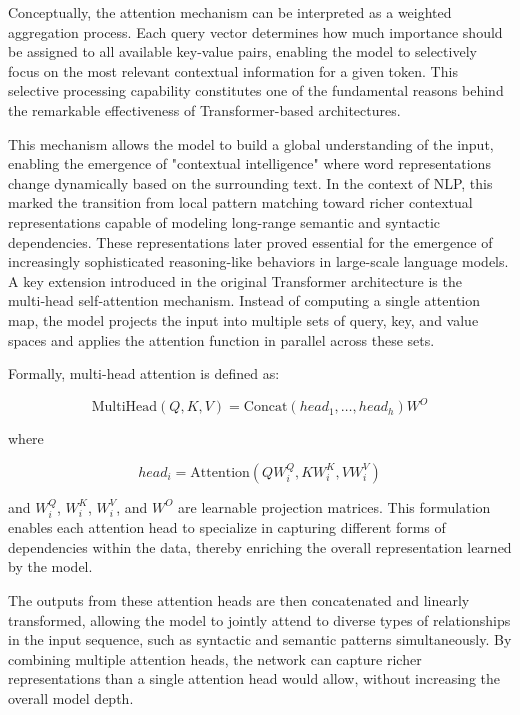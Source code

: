 Conceptually, the attention mechanism can be interpreted as a weighted aggregation process. Each query vector determines how much importance should be assigned to all available key-value pairs, enabling the model to selectively focus on the most relevant contextual information for a given token. This selective processing capability constitutes one of the fundamental reasons behind the remarkable effectiveness of Transformer-based architectures.

This mechanism allows the model to build a global understanding of the input, enabling the emergence of "contextual intelligence" where word representations change dynamically based on the surrounding text. In the context of NLP, this marked the transition from local pattern matching toward richer contextual representations capable of modeling long-range semantic and syntactic dependencies. These representations later proved essential for the emergence of increasingly sophisticated reasoning-like behaviors in large-scale language models.
A key extension introduced in the original Transformer architecture is the multi‑head self‑attention mechanism. Instead of computing a single attention map, the model projects the input into multiple sets of query, key, and value spaces and applies the attention function in parallel across these sets. 


Formally, multi-head attention is defined as:

\begin{equation}
    \text{MultiHead}(Q,K,V)=\text{Concat}(head_1,\dots,head_h)W^O
\end{equation}

where

\begin{equation}
    head_i=\text{Attention}(QW_i^Q,KW_i^K,VW_i^V)
\end{equation}

and $W_i^Q$, $W_i^K$, $W_i^V$, and $W^O$ are learnable projection matrices. This formulation enables each attention head to specialize in capturing different forms of dependencies within the data, thereby enriching the overall representation learned by the model.


The outputs from these attention heads are then concatenated and linearly transformed, allowing the model to jointly attend to diverse types of relationships in the input sequence, such as syntactic and semantic patterns simultaneously. By combining multiple attention heads, the network can capture richer representations than a single attention head would allow, without increasing the overall model depth.


